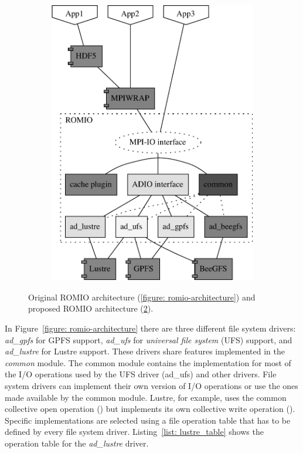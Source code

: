 \begin{figure}[!htb]
\begin{subfigure}[t]{0.55\textwidth}
  \includegraphics[width=\textwidth]{figures/new-romio-architecture-baw.pdf}
  \caption{}
  \label{figure: new-romio-architecture}
  \end{subfigure}
  \caption{Original ROMIO architecture (\ref{figure: romio-architecture}) and proposed ROMIO architecture (\ref{figure: new-romio-architecture}).}
\end{figure}

In Figure~\ref{figure: romio-architecture} there are three different file system drivers: \textit{ad\_gpfs} for GPFS support, \textit{ad\_ufs} for \textit{universal file system} (UFS) 
support, and \textit{ad\_lustre} for Lustre support. These drivers share features implemented in the \textit{common} module. The common module contains the implementation for most of 
the I/O operations used by the UFS driver (ad\_ufs) and other drivers. File system drivers can implement their own version of I/O operations or use the ones made available by the common 
module. Lustre, for example, uses the common collective open operation () but implements its own collective write operation (). 
Specific implementations are selected using a file operation table that has to be defined by every file system driver. Listing~\ref{list: lustre_table} shows the operation table for the \textit{ad\_lustre} 
driver.

